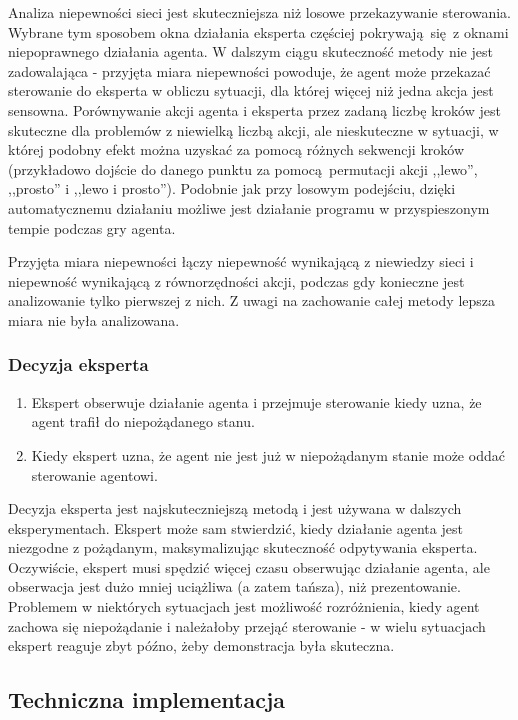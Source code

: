 Analiza niepewności sieci jest skuteczniejsza niż losowe przekazywanie sterowania. Wybrane tym sposobem okna działania eksperta częściej pokrywają się z oknami niepoprawnego działania agenta. W dalszym ciągu skuteczność metody nie jest zadowalająca - przyjęta miara niepewności powoduje, że agent może przekazać sterowanie do eksperta w obliczu sytuacji, dla której więcej niż jedna akcja jest sensowna. Porównywanie akcji agenta i eksperta przez zadaną liczbę kroków jest skuteczne dla problemów z niewielką liczbą akcji, ale nieskuteczne w sytuacji, w której podobny efekt można uzyskać za pomocą różnych sekwencji kroków (przykładowo dojście do danego punktu za pomocą permutacji akcji ,,lewo'', ,,prosto'' i ,,lewo i prosto''). Podobnie jak przy losowym podejściu, dzięki automatycznemu działaniu możliwe jest działanie programu w przyspieszonym tempie podczas gry agenta.

Przyjęta miara niepewności łączy niepewność wynikającą z niewiedzy sieci i niepewność wynikającą z równorzędności akcji, podczas gdy konieczne jest analizowanie tylko pierwszej z nich. Z uwagi na zachowanie całej metody lepsza miara nie była analizowana.

\subsubsection{Decyzja eksperta}\label{expert_call}
\begin{enumerate}
\item Ekspert obserwuje działanie agenta i przejmuje sterowanie kiedy uzna, że agent trafił do niepożądanego stanu.
\item Kiedy ekspert uzna, że agent nie jest już w niepożądanym stanie może oddać sterowanie agentowi.
\end{enumerate}

Decyzja eksperta jest najskuteczniejszą metodą i jest używana w dalszych eksperymentach. Ekspert może sam stwierdzić, kiedy działanie agenta jest niezgodne z pożądanym, maksymalizując skuteczność odpytywania eksperta. Oczywiście, ekspert musi spędzić więcej czasu obserwując działanie agenta, ale obserwacja jest dużo mniej uciążliwa (a zatem tańsza), niż prezentowanie. Problemem w niektórych sytuacjach jest możliwość rozróżnienia, kiedy agent zachowa się niepożądanie i należałoby przejąć sterowanie - w wielu sytuacjach ekspert reaguje zbyt późno, żeby demonstracja była skuteczna.

\subsection{Techniczna implementacja}

